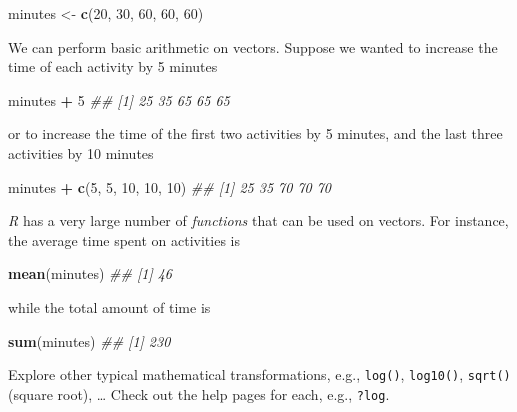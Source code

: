 \documentclass[
]{book}
\newenvironment{Shaded}{\begin{snugshade}}{\end{snugshade}}
\newcommand{\CommentTok}[1]{\textcolor[rgb]{0.56,0.35,0.01}{\textit{#1}}}
\newcommand{\DecValTok}[1]{\textcolor[rgb]{0.00,0.00,0.81}{#1}}
\newcommand{\KeywordTok}[1]{\textcolor[rgb]{0.13,0.29,0.53}{\textbf{#1}}}
\newcommand{\NormalTok}[1]{#1}
\newcommand{\OperatorTok}[1]{\textcolor[rgb]{0.81,0.36,0.00}{\textbf{#1}}}
\newcommand{\StringTok}[1]{\textcolor[rgb]{0.31,0.60,0.02}{#1}}
\begin{document}
\begin{Shaded}
\begin{Highlighting}[]
\NormalTok{minutes <-}\StringTok{ }\KeywordTok{c}\NormalTok{(}\DecValTok{20}\NormalTok{, }\DecValTok{30}\NormalTok{, }\DecValTok{60}\NormalTok{, }\DecValTok{60}\NormalTok{, }\DecValTok{60}\NormalTok{)}
\end{Highlighting}
\end{Shaded}

We can perform basic arithmetic on vectors. Suppose we wanted to increase the time of each activity by 5 minutes

\begin{Shaded}
\begin{Highlighting}[]
\NormalTok{minutes }\OperatorTok{+}\StringTok{ }\DecValTok{5}
\CommentTok{## [1] 25 35 65 65 65}
\end{Highlighting}
\end{Shaded}

or to increase the time of the first two activities by 5 minutes, and the last three activities by 10 minutes

\begin{Shaded}
\begin{Highlighting}[]
\NormalTok{minutes }\OperatorTok{+}\StringTok{ }\KeywordTok{c}\NormalTok{(}\DecValTok{5}\NormalTok{, }\DecValTok{5}\NormalTok{, }\DecValTok{10}\NormalTok{, }\DecValTok{10}\NormalTok{, }\DecValTok{10}\NormalTok{)}
\CommentTok{## [1] 25 35 70 70 70}
\end{Highlighting}
\end{Shaded}

\emph{R} has a very large number of \emph{functions} that can be used on vectors. For instance, the average time spent on activities is

\begin{Shaded}
\begin{Highlighting}[]
\KeywordTok{mean}\NormalTok{(minutes)}
\CommentTok{## [1] 46}
\end{Highlighting}
\end{Shaded}

while the total amount of time is

\begin{Shaded}
\begin{Highlighting}[]
\KeywordTok{sum}\NormalTok{(minutes)}
\CommentTok{## [1] 230}
\end{Highlighting}
\end{Shaded}

Explore other typical mathematical transformations, e.g., \texttt{log()}, \texttt{log10()}, \texttt{sqrt()} (square root), \ldots{} Check out the help pages for each, e.g., \texttt{?log}.
\end{document}
